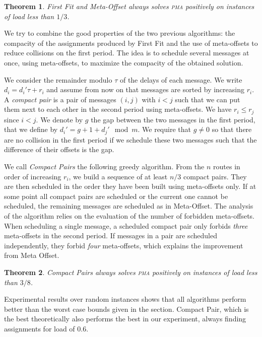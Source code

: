 \documentclass[10pt, conference, letterpaper]{algotel}
\newtheorem{theorem}{Theorem}
\newcommand\pma{\textsc{pma}\xspace}
\begin{document}
\begin{theorem}
First Fit and Meta-Offset always solves \pma positively on instances of load less than $1/3$.
\end{theorem}

 We try to combine the good properties of the two previous algorithms: the compacity of the assignments produced by First Fit and the use of meta-offsets to reduce collisions on the first period. The idea is to schedule several messages at once, using meta-offsets, to maximize the compacity of the obtained solution. 

 We consider the remainder modulo $\tau$ of the delays of each message. We write $d_i = d_{i}'\tau + r_i$ and assume from now on that messages are sorted by increasing $r_i$. A \emph{compact pair} is a pair of messages $(i,j)$ with $i < j$ such that we can put them next to each other in the second period using meta-offsets.
We have $r_i \leq r_j$ since $i < j$. We denote by $g$ the gap between the two messages in the first period, that we define by $d_{i}' = g + 1 + d_{j}' \mod m$. We require that $g \neq 0$ so that there are no collision in the first period if we schedule these two messages such that the difference of their offsets is the gap. 


We call \emph{Compact Pairs} the following greedy algorithm. From the $n$ routes in order
of increasing $r_i$, we build a sequence of at least $n/3$ compact pairs. They are then scheduled in the order they have been built using meta-offsets only. If at some point all compact pairs are scheduled or the current one cannot be scheduled, the remaining messages are scheduled as in Meta-Offset. The analysis of the algorithm relies on the evaluation of the number of forbidden meta-offsets. When scheduling a single message, a scheduled compact pair only forbids \emph{three} meta-offsets in the second period. If messages in a pair are scheduled independently, they forbid \emph{four} meta-offsets, which explains the improvement from Meta Offset.

\begin{theorem}
Compact Pairs always solves \pma positively on instances of load less than $3/8$.
\end{theorem}

Experimental results over random instances shows that all algorithms perform better than the worst case bounds given in the section. Compact Pair, which is the best theoretically also performs the best in our experiment, always finding assignments for load of $0.6$. 
\end{document}
